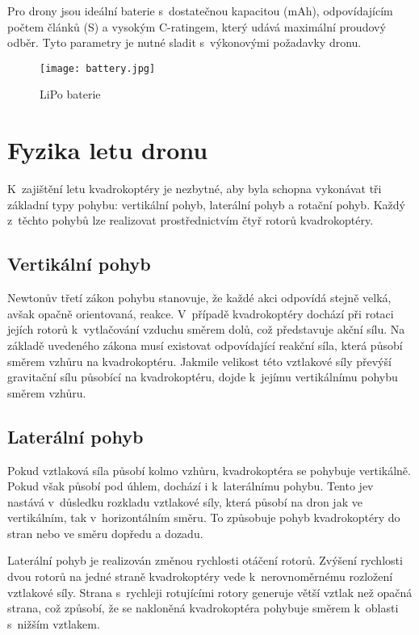 \documentclass[12pt]{report}
\begin{document}
Pro drony jsou ideální baterie s~dostatečnou kapacitou (mAh), odpovídajícím počtem článků (S) a vysokým C-ratingem, který udává maximální proudový odběr. Tyto parametry je nutné sladit s~výkonovými požadavky dronu. \cite{mainbook}

\begin{figure}[H]
	\centering
	\texttt{[image: battery.jpg]}
	\caption{LiPo baterie \cite{dojo}}
	\label{fig:battery.jpg}
\end{figure}

\chapter[Fyzika letu dron]{Fyzika letu dronu}
K~zajištění letu kvadrokoptéry je nezbytné, aby byla schopna vykonávat tři základní typy pohybu: vertikální pohyb, laterální pohyb a rotační pohyb. Každý z~těchto pohybů lze realizovat prostřednictvím čtyř rotorů kvadrokoptéry.

\section[Vertikální pohyb]{Vertikální pohyb}
Newtonův třetí zákon pohybu stanovuje, že každé akci odpovídá stejně velká, avšak opačně orientovaná, reakce. V~případě kvadrokoptéry dochází při rotaci jejích rotorů k~vytlačování vzduchu směrem dolů, což představuje akční sílu. Na základě uvedeného zákona musí existovat odpovídající reakční síla, která působí směrem vzhůru na kvadrokoptéru. Jakmile velikost této vztlakové síly převýší gravitační sílu působící na kvadrokoptéru, dojde k~jejímu vertikálnímu pohybu směrem vzhůru.

\section[Laterální pohyb]{Laterální pohyb}
Pokud vztlaková síla působí kolmo vzhůru, kvadrokoptéra se pohybuje vertikálně. Pokud však působí pod úhlem, dochází i k~laterálnímu pohybu. Tento jev nastává v~důsledku rozkladu vztlakové síly, která působí na dron jak ve vertikálním, tak v~horizontálním směru. To způsobuje pohyb kvadrokoptéry do stran nebo ve směru dopředu a dozadu.

Laterální pohyb je realizován změnou rychlosti otáčení rotorů. Zvýšení rychlosti dvou rotorů na jedné straně kvadrokoptéry vede k~nerovnoměrnému rozložení vztlakové síly. Strana s~rychleji rotujícími rotory generuje větší vztlak než opačná strana, což způsobí, že se nakloněná kvadrokoptéra pohybuje směrem k~oblasti s~nižším vztlakem.
\end{document}
